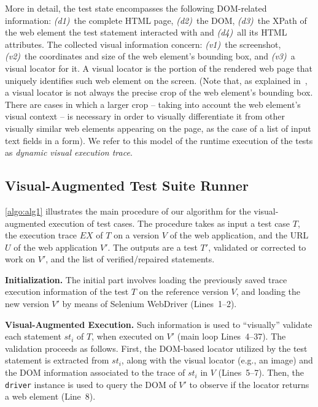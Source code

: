 
More in detail, the test state encompasses the following DOM-related information: \textit{(d1)}~the complete HTML page, \textit{(d2)}~the DOM, \textit{(d3)}~the XPath of the web element the test statement interacted with and \textit{(d4)}~all its HTML attributes. The collected visual information concern: \textit{(v1)}~the screenshot, \textit{(v2)}~the coordinates and size of the web element's bounding box, and \textit{(v3)}~a visual locator for it. A visual locator is the portion of the rendered web page that uniquely identifies such web element on the screen. (Note that, as explained in~\cite{2014-Stocco-SCAM,2015-Leotta-SAC}, a visual locator is not always the precise crop of the web element's bounding box. There are cases in which a larger crop -- taking into account the web element's visual context --  is necessary in order to visually differentiate it from other visually similar web elements appearing on the page, as the case of a list of input text fields in a form).
%
We refer to this model of the runtime execution of the tests as \textit{dynamic visual execution trace}.

\subsection{Visual-Augmented Test Suite Runner}

\autoref{algo:alg1} illustrates the main procedure of our algorithm for the visual-augmented execution of test cases. The procedure takes as input a test case $T$, 
the execution trace $EX$ of $T$ on a version $V$ of the web application, and the URL $U$ of the web application $V'$. The outputs are a test $T'$, validated or corrected to work on $V'$, and the list of verified/repaired statements. 

\noindent
\textbf{Initialization.} 
The initial part involves loading the previously saved trace execution information of the test $T$ on the reference version $V$, and loading the new version $V'$ by means of Selenium WebDriver (Lines~1--2). 

\noindent
\textbf{Visual-Augmented Execution.}
Such information is used to ``visually'' validate each statement $st_i$ of $T$, when executed on $V'$ (main loop Lines~4--37). The validation proceeds as follows. First, the DOM-based locator utilized by the test statement is extracted from $st_i$, along with the visual locator (e.g., an image) and the DOM information associated to the trace of $st_i$ in $V$  (Lines~5--7). Then, the \texttt{driver} instance is used to query the DOM of $V'$ to observe if the locator returns a web element (Line~8). 

